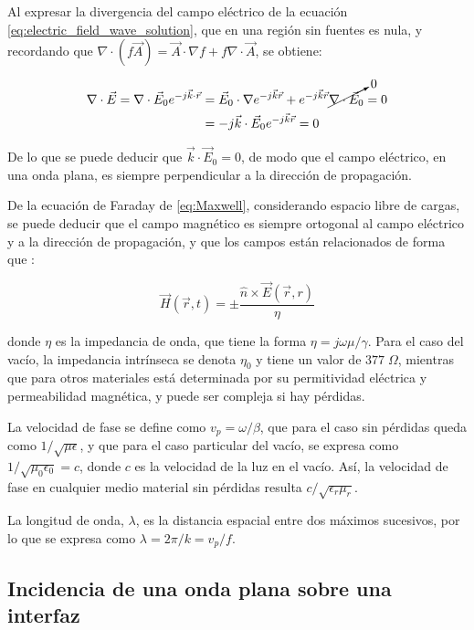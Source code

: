 Al expresar la divergencia del campo eléctrico de la ecuación \ref{eq:electric_field_wave_solution}, que en una región sin fuentes es nula, y recordando que $\nabla \cdot (f \vec{A}) = \vec{A} \cdot \nabla f + f \nabla \cdot \vec{A}$, se obtiene:


\begin{align}
	\nabla \cdot \vec{E} = \nabla \cdot \vec{E}_0 e^{-j\vec{k} \cdot \vec{r}} & = \vec{E}_0 \cdot \nabla e^{-j \vec{k} \vec{r}} + e^{-j \vec{k} \vec{r}} \cancelto{0}{\nabla \cdot \vec{E}_0} = 0 \nonumber \\
	& = -j \vec{k} \cdot \vec{E}_0 e^{-j \vec{k} \vec{r}} = 0
\end{align}

De lo que se puede deducir que $\vec{k} \cdot \vec{E}_0 = 0$, de modo que el campo eléctrico, en una onda plana, es siempre perpendicular a la dirección de propagación.

De la ecuación de Faraday de \ref{eq:Maxwell}, considerando espacio libre de cargas, se puede deducir que el campo magnético es siempre ortogonal al campo eléctrico y a la dirección de propagación, y que los campos están relacionados de forma que \cite{Fernandez:Electromag}:

\begin{equation}
	\vec{H}(\vec{r},t) = \pm \frac{\hat{n} \times \vec{E}(\vec{r},r)}{\eta}
\end{equation}

donde $\eta$ es la impedancia de onda, que tiene la forma $\eta = j \omega \mu / \gamma$. Para el caso del vacío, la impedancia intrínseca se denota $\eta_0$ y tiene un valor de $377\; \Omega$, mientras que para otros materiales está determinada por su permitividad eléctrica y permeabilidad magnética, y puede ser compleja si hay pérdidas.

La velocidad de fase se define como $v_p=\omega/\beta$, que para el caso sin pérdidas queda como $1/\sqrt{\mu \epsilon}$, y que para el caso particular del vacío, se expresa como $1/\sqrt{\mu_0 \epsilon_0} = c$, donde $c$ es la velocidad de la luz en el vacío. Así, la velocidad de fase en cualquier medio material sin pérdidas resulta $c/\sqrt{\epsilon_r \mu_r}$.

La longitud de onda, $\lambda$, es la distancia espacial entre dos máximos sucesivos, por lo que se expresa como $\lambda = 2\pi / k = v_p/f$.

\subsection{Incidencia de una onda plana sobre una interfaz}

